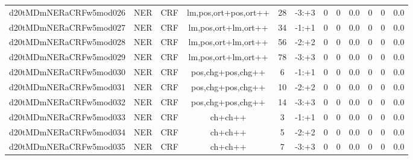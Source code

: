 \documentclass[a4paper]{article}
\begin{document}
\begin{landscape}
\begin{center}
\begin{tabular}{ |c|c|c|c|c|c|c|c|c|c|c|c|}
 
 	
 	\small{ d20tMDmNERaCRFw5mod026 } & \small{ NER} & \small{  CRF }  & lm,pos,ort+pos,ort++  &  28 &  \small{  -3:+3 }  &  0 & 0 & 0.0  &  0 & 0 & 0.0 \\
 	

 
 	
 	\small{ d20tMDmNERaCRFw5mod027 } & \small{ NER} & \small{  CRF }  & lm,pos,ort+lm,ort++  &  34 &  \small{  -1:+1 }  &  0 & 0 & 0.0  &  0 & 0 & 0.0 \\
 	

 
 	
 	\small{ d20tMDmNERaCRFw5mod028 } & \small{ NER} & \small{  CRF }  & lm,pos,ort+lm,ort++  &  56 &  \small{  -2:+2 }  &  0 & 0 & 0.0  &  0 & 0 & 0.0 \\
 	

 
 	
 	\small{ d20tMDmNERaCRFw5mod029 } & \small{ NER} & \small{  CRF }  & lm,pos,ort+lm,ort++  &  78 &  \small{  -3:+3 }  &  0 & 0 & 0.0  &  0 & 0 & 0.0 \\
 	

 
 	
 	\small{ d20tMDmNERaCRFw5mod030 } & \small{ NER} & \small{  CRF }  & pos,chg+pos,chg++  &  6 &  \small{  -1:+1 }  &  0 & 0 & 0.0  &  0 & 0 & 0.0 \\
 	

 
 	
 	\small{ d20tMDmNERaCRFw5mod031 } & \small{ NER} & \small{  CRF }  & pos,chg+pos,chg++  &  10 &  \small{  -2:+2 }  &  0 & 0 & 0.0  &  0 & 0 & 0.0 \\
 	

 
 	
 	\small{ d20tMDmNERaCRFw5mod032 } & \small{ NER} & \small{  CRF }  & pos,chg+pos,chg++  &  14 &  \small{  -3:+3 }  &  0 & 0 & 0.0  &  0 & 0 & 0.0 \\
 	

 
 	
 	\small{ d20tMDmNERaCRFw5mod033 } & \small{ NER} & \small{  CRF }  & ch+ch++  &  3 &  \small{  -1:+1 }  &  0 & 0 & 0.0  &  0 & 0 & 0.0 \\
 	

 
 	
 	\small{ d20tMDmNERaCRFw5mod034 } & \small{ NER} & \small{  CRF }  & ch+ch++  &  5 &  \small{  -2:+2 }  &  0 & 0 & 0.0  &  0 & 0 & 0.0 \\
 	

 
 	
 	\small{ d20tMDmNERaCRFw5mod035 } & \small{ NER} & \small{  CRF }  & ch+ch++  &  7 &  \small{  -3:+3 }  &  0 & 0 & 0.0  &  0 & 0 & 0.0 \\
 	


\end{tabular}
\end{center}
\end{landscape}
\end{document}
